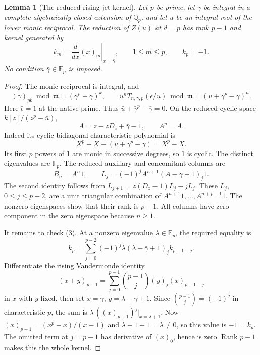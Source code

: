\documentclass[11pt]{article}
\newtheorem{lemma}{Lemma}
\begin{document}
\begin{lemma}[The reduced rising-jet kernel]\label{lem:kernel}
Let $p$ be prime, let $\gamma$ be integral in a complete algebraically
closed extension of $\mathbb Q_p$, and let $u$ be an integral root of
the lower monic reciprocal. The reduction of $Z(u)$ at $d=p$
has rank $p-1$ and kernel generated by
\[
 k_m=\left.\frac{d}{dx}(x)_m\right|_{x=\bar\gamma},
 \qquad1\le m\le p,\qquad k_p=-1.
                                                               \tag{3}
\]
No condition $\bar\gamma\in\mathbb F_p$ is imposed.
\end{lemma}
\begin{proof}
The monic reciprocal is integral, and
\[
 (\gamma)_{pk}\bmod\mathfrak m
     =(\bar\gamma^p-\bar\gamma)^k,\qquad
 u^nT_{n,\gamma,p}(\epsilon/u)\bmod\mathfrak m
     =(u+\bar\gamma^p-\bar\gamma)^n.
\]
Here $\bar\epsilon=1$ at the native prime.
Thus $\bar u+\bar\gamma^p-\bar\gamma=0$.
On the reduced cyclic space $k[z]/(z^p-\bar u)$,
\[
 A=z-zD_z+\bar\gamma-1,\qquad A^p=A.
\]
Indeed its cyclic bidiagonal characteristic polynomial is
\[
 X^p-X-(\bar u+\bar\gamma^p-\bar\gamma)=X^p-X.
\]
Its first $p$ powers of $1$ are monic in successive degrees, so $1$
is cyclic. The distinct eigenvalues are $\mathbb F_p$.
The reduced auxiliary and concomitant columns are
\[
 B_n=A^n1,\qquad
 L_j=(-1)^j A^{n+1}(A-\bar\gamma+1)_j1.
\]
The second identity follows from
$L_{j+1}=z(D_z-1)L_j-jL_j$.
These $L_j$, $0\le j\le p-2$, are a unit triangular combination of
$A^{n+1}1,\ldots,A^{n+p-1}1$.
The nonzero eigenspaces show that their rank is $p-1$.
All columns have zero component in the zero eigenspace because $n\ge1$.

It remains to check (3). At a nonzero eigenvalue $\lambda\in\mathbb F_p$,
the required equality is
\[
 k_p=\sum_{j=0}^{p-2}(-1)^j\lambda
          (\lambda-\bar\gamma+1)_j k_{p-1-j}.
\]
Differentiate the rising Vandermonde identity
\[
 (x+y)_{p-1}=\sum_{j=0}^{p-1}\binom{p-1}{j}
                     (y)_j(x)_{p-1-j}
\]
in $x$ with $y$ fixed, then set
$x=\bar\gamma$, $y=\lambda-\bar\gamma+1$.
Since $\binom{p-1}{j}=(-1)^j$ in characteristic $p$, the sum
is $\lambda\,((x)_{p-1})'|_{x=\lambda+1}$.
Now $(x)_{p-1}=(x^p-x)/(x-1)$ and
$\lambda+1-1=\lambda\ne0$, so this value is $-1=k_p$.
The omitted term at $j=p-1$ has derivative of $(x)_0$, hence is zero.
Rank $p-1$ makes this the whole kernel.
\end{proof}
\end{document}
